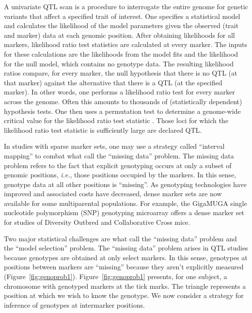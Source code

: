 \documentclass[oneside]{book}\usepackage[]{graphicx}\usepackage[]{color}
\begin{document}
A univariate QTL scan is a procedure to interrogate the entire genome for genetic
variants that affect a specified trait of interest.
One specifies a statistical model and calculates the
likelihood of the model parameters given the observed (trait and marker) data at each genomic position. 
After obtaining likelihoods for all markers, likelihood ratio test statistics are calculated
at every marker. The inputs for these calculations are the likelihoods from the model fits 
and the likelihood for the null model, which contains no genotype data.
The resulting likelihood ratios compare, for every marker, the null hypothesis that there is no 
QTL (at that marker) against the alternative that there is a QTL (at the specified marker).
In other words, one performs a likelihood ratio test for every marker across the genome.
Often this amounts to thousands of (statistically dependent) hypothesis tests.
One then uses a permutation test to determine a genome-wide critical value
for the likelihood ratio test statistic \citep{churchill1994empirical}.
Those loci for which the likelihood ratio test statistic is sufficiently large are declared QTL. 



In studies with sparse marker sets, one may use a strategy called ``interval mapping'' 
to combat what \citet{broman2009guide} call the ``missing data'' problem. 
The missing data problem refers to the fact that explicit genotyping occurs at
only a subset of genomic positions, \emph{i.e.}, those positions
occupied by the markers. In this sense, genotype data at all other
positions is ``missing''. As genotyping technologies have improved and
associated costs have decreased, dense marker sets are now available for
some multiparental populations. For example, the GigaMUGA single
nucleotide polymorphism (SNP) genotyping microarray \citep{morgan2015mouse} 
offers a dense marker set for studies of Diversity Outbred and 
Collaborative Cross mice.









Two major statistical challenges are what \citet{broman2009guide} call 
the ``missing data'' problem and the ``model selection'' problem. 
The ``missing data'' problem arises in QTL studies because genotypes are obtained
at only select markers. In this sense, genotypes at positions between
markers are ``missing'' because they aren't explicitly measured
(Figure~\ref{fig:genoprob1}). Figure~\ref{fig:genoprob1} presents, for
one subject, a chromosome with genotyped markers at the tick marks.
The triangle represents a position at which we wish to know the genotype.
We now consider a strategy for inference of genotypes at intermarker positions.
\end{document}
